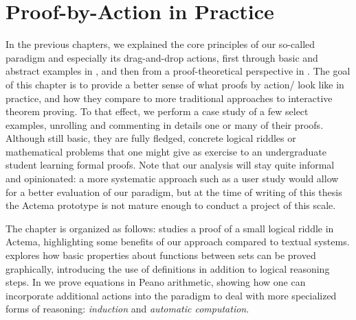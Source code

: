 \setchapterpreamble[u]{\margintoc}
\chapter{Proof-by-Action in Practice}

In the previous chapters, we explained the core principles of our so-called
 paradigm and especially its drag-and-drop actions, first through
basic and abstract examples in , and then from a proof-theoretical
perspective in . The goal of this chapter is to provide a better
sense of what proofs by action/ look like in practice, and how they compare
to more traditional approaches to interactive theorem proving. To that effect,
we perform a case study of a few select examples, unrolling and commenting in
details one or many of their proofs. Although still basic, they are fully
fledged, concrete logical riddles or mathematical problems that one might give
as exercise to an undergraduate student learning formal proofs. Note that our
analysis will stay quite informal and opinionated: a more systematic approach
such as a user study would allow for a better evaluation of our paradigm, but at
the time of writing of this thesis the Actema prototype is not mature enough to
conduct a project of this scale.

The chapter is organized as follows:  studies a proof of a small
logical riddle in Actema, highlighting some benefits of our approach compared to
textual systems.  explores how basic properties about functions
between sets can be proved graphically, introducing the use of definitions in
addition to logical reasoning steps. In  we prove equations in
Peano arithmetic, showing how one can incorporate additional actions into the
paradigm to deal with more specialized forms of reasoning: \emph{induction} and
\emph{automatic computation}.


  
